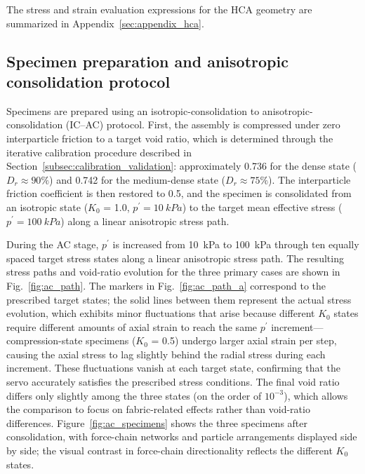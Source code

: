 \documentclass[a4paper,fleqn]{cas-sc}
\newcommand{\Kzero}{\ensuremath{K_0}}
\newcommand{\pmean}{\ensuremath{p^\prime}}
\begin{document}
The stress and strain evaluation expressions for the HCA geometry are summarized in Appendix~\ref{sec:appendix_hca}.

\subsection{Specimen preparation and anisotropic consolidation protocol}
\label{subsec:preparation}

Specimens are prepared using an isotropic-consolidation to anisotropic-consolidation (IC--AC) protocol. First, the assembly is compressed under zero interparticle friction to a target void ratio, which is determined through the iterative calibration procedure described in Section~\ref{subsec:calibration_validation}: approximately 0.736 for the dense state ($D_r \approx 90\%$) and 0.742 for the medium-dense state ($D_r \approx 75\%$). The interparticle friction coefficient is then restored to 0.5, and the specimen is consolidated from an isotropic state (\Kzero{} = 1.0, $\pmean=\SI{10}{kPa}$) to the target mean effective stress ($\pmean=\SI{100}{kPa}$) along a linear anisotropic stress path.

During the AC stage, $\pmean$ is increased from \SI{10}{kPa} to \SI{100}{kPa} through ten equally spaced target stress states along a linear anisotropic stress path. The resulting stress paths and void-ratio evolution for the three primary cases are shown in Fig.~\ref{fig:ac_path}. The markers in Fig.~\ref{fig:ac_path_a} correspond to the prescribed target states; the solid lines between them represent the actual stress evolution, which exhibits minor fluctuations that arise because different \Kzero{} states require different amounts of axial strain to reach the same $\pmean$ increment---compression-state specimens (\Kzero{} = 0.5) undergo larger axial strain per step, causing the axial stress to lag slightly behind the radial stress during each increment. These fluctuations vanish at each target state, confirming that the servo accurately satisfies the prescribed stress conditions. The final void ratio differs only slightly among the three states (on the order of $10^{-3}$), which allows the comparison to focus on fabric-related effects rather than void-ratio differences. Figure~\ref{fig:ac_specimens} shows the three specimens after consolidation, with force-chain networks and particle arrangements displayed side by side; the visual contrast in force-chain directionality reflects the different \Kzero{} states.
\end{document}
